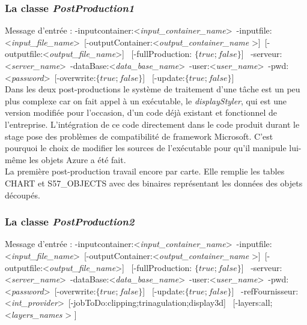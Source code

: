 \subsubsection{La classe \textit{PostProduction1}}
Message d'entrée : 
-inputcontainer:\textless \textit{input\_container\_name}\textgreater \   
-inputfile:\textless \textit{input\_file\_name}\textgreater \ 
[-outputContainer:\textless \textit{output\_container\_name} \textgreater ]\  
[-outputfile:\textless \textit{output\_file\_name}\textgreater ] \ 
[-fullProduction: $\{true;false\}$] \ 
-serveur:\textless \textit{server\_name}\textgreater \   
-dataBase:\textless \textit{data\_base\_name}\textgreater \   
-user:\textless \textit{user\_name}\textgreater  \ 
-pwd:\textless \textit{password}\textgreater  \ 
[-overwrite:$\{true;false\}$] \ 
[-update:$\{true;false\}$] \\ 

Dans les deux post-productions le système de traitement d'une tâche
est un peu plus complexe car on fait appel à un exécutable, le
\textit{displayStyler}, qui est une version modifiée pour l'occasion,
d'un code déjà existant et fonctionnel de l'entreprise. L'intégration
de ce code directement dans le code produit durant le stage pose des
problèmes de compatibilité de framework Microsoft. C'est pourquoi le
choix de modifier les sources de l'exécutable pour qu'il manipule
lui-même les objets Azure a été fait.\\

La première post-production travail encore par carte. Elle remplie les
tables CHART et S57\_OBJECTS avec des binaires représentant les
données des objets découpés.


\subsubsection{La classe \textit{PostProduction2}}
Message d'entrée : 
-inputcontainer:\textless \textit{input\_container\_name}\textgreater \   
-inputfile:\textless \textit{input\_file\_name}\textgreater \ 
[-outputContainer:\textless \textit{output\_container\_name} \textgreater ]\  
[-outputfile:\textless \textit{output\_file\_name}\textgreater ] \ 
[-fullProduction: $\{true;false\}$] \ 
-serveur:\textless \textit{server\_name}\textgreater \   
-dataBase:\textless \textit{data\_base\_name}\textgreater \   
-user:\textless \textit{user\_name}\textgreater  \ 
-pwd:\textless \textit{password}\textgreater  \ 
[-overwrite:$\{true;false\}$] \ 
[-update:$\{true;false\}$] \ 
-refFournisseur:\textless \textit{int\_provider}\textgreater \   
[-jobToDo:{clipping;trinagulation;display3d}] \ 
[-layers:{all;\textless \textit{layers\_names} \textgreater} ] \\

